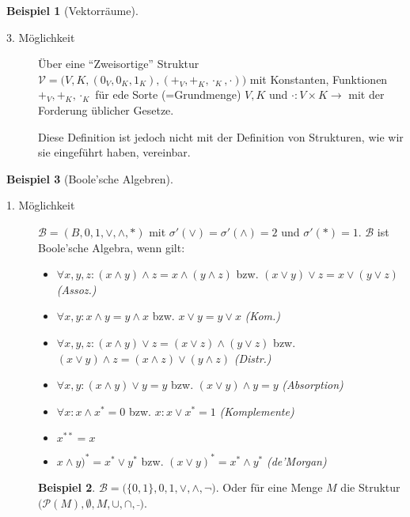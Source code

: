 \documentclass{article}
\theoremstyle{definition}
\newtheorem*{bsp}{Beispiel}
\theoremstyle{plain}
\newcommand{\m}[1]{\mathcal{#1}}
\begin{document}
\begin{bsp}[Vektorräume]
\begin{description}
            \item[3. Möglichkeit]
            Über eine ``Zweisortige'' Struktur $ \m{V} = \big(V, K, (0_V, 0_K, 1_K), (+_V, +_K, \cdot_K, \cdot)\big) $ mit Konstanten, Funktionen $ +_V, +_K, \cdot_K $ für ede Sorte (=Grundmenge) $ V, K $ und $ \cdot : V \times K \rightarrow $ mit der Forderung üblicher Gesetze.

            Diese Definition ist jedoch nicht mit der Definition von Strukturen, wie wir sie eingeführt haben, vereinbar.
        \end{description}
    \end{bsp}

    \begin{bsp}[Boole'sche Algebren]
        ~\par
        \begin{description}
            \item[1. Möglichkeit]
            \label{itm:boolesche-algebra-struktur}
            $ \m{B}= (B, 0, 1, \lor, \land, *) $ mit $ \sigma'(\lor) = \sigma'(\land) = 2 $ und $ \sigma'(*) = 1 $.
            $ \m{B} $ ist Boole'sche Algebra, wenn gilt:
            \begin{itemize}
                \item $ \forall x, y, z: (x \land y) \land z = x \land (y \land z) $ bzw. $ (x \lor y) \lor z = x \lor (y \lor z) $ \hfill \textit{(Assoz.)}
                \item $ \forall x, y: x \land y = y \land x $ bzw. $ x \lor y = y \lor x $ \hfill \textit{(Kom.)}
                \item $ \forall x, y, z: (x \land y) \lor z = (x \lor z) \land (y \lor z) $ bzw. $ (x \lor y) \land z = (x \land z) \lor (y \land z) $ \hfill \textit{(Distr.)}
                \item $ \forall x, y: (x \land y) \lor y = y $ bzw. $ (x \lor y) \land y = y $ \hfill \textit{(Absorption)}
                \item $ \forall x: x \land x^* = 0 $ bzw. $ x: x \lor x^* = 1 $ \hfill \textit{(Komplemente)}
                \item $ x^{**} = x $
                \item $ x \land y)^* = x^* \lor y^* $ bzw. $ (x \lor y)^* = x^* \land y^* $ \hfill \textit{(de'Morgan)}
            \end{itemize}
            \begin{bsp}
                $ \m{B} = \big(\{0, 1\}, 0, 1, \lor, \land, \neg\big) $.
                Oder für eine Menge $ M $ die Struktur $ \big(\m{P}(M), \emptyset, M, \cup, \cap, \bar\; \big) $.
            \end{bsp}


\end{description}
\end{bsp}
\end{document}
